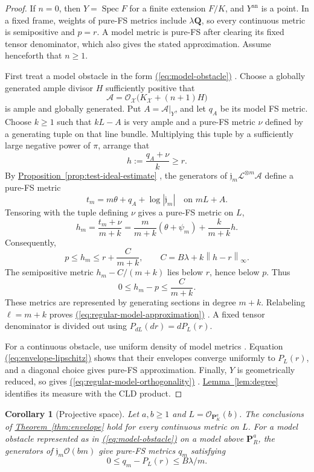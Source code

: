 \documentclass[11pt]{amsart}
\newtheorem{corollary}[theorem]{Corollary}
\theoremstyle{definition}
\theoremstyle{remark}
\numberwithin{equation}{section}
\newcommand{\an}{\mathrm{an}}
\newcommand{\PP}{\mathbf P}
\newcommand{\OO}{\mathcal O}
\newcommand{\cX}{\mathscr X}
\newcommand{\cL}{\mathscr L}
\newcommand{\cA}{\mathscr A}
\newcommand{\norm}[1]{\left\lVert#1\right\rVert}
\newcommand{\namedref}[2]{%
 \begingroup
 \ifstrequal{#1}{Section}{\hypersetup{linkcolor=sectionteal}}{%
  \ifstrequal{#1}{Appendix}{\hypersetup{linkcolor=sectionteal}}{}}%
 \hyperref[#2]{#1~\ref*{#2}}%
 \endgroup}
\renewcommand{\eqref}[1]{%
 \begingroup\hypersetup{linkcolor=equationviolet}%
 \hyperref[#1]{\textup{(\ref*{#1})}}%
 \endgroup}
\begin{document}
\begin{proof}
If \(n=0\), then \(Y=\operatorname{Spec}F\) for a finite extension
\(F/K\), and \(Y^\an\) is a point. In a fixed frame, weights of pure-FS
metrics include \(\lambda\mathbf Q\), so every continuous metric is
semipositive and \(p=r\). A model metric is pure-FS after clearing its
fixed tensor denominator, which also gives the stated approximation.
Assume henceforth that \(n\ge1\).

First treat a model obstacle in the form \eqref{eq:model-obstacle}.
Choose a globally generated ample divisor \(H\) sufficiently positive that
\[
 \cA=\OO_{\cX}\bigl(K_{\cX}+(n+1)H\bigr)
\]
is ample and globally generated. Put \(A=\cA|_Y\), and let \(q_A\)
be its model FS metric.
Choose \(k\ge1\) such that \(kL-A\) is very ample and a pure-FS metric
\(\nu\) defined by a generating tuple on that line bundle.
Multiplying this tuple by a sufficiently large negative power of \(\pi\),
arrange that
\[
 h:=\frac{q_A+\nu}{k}\ge r.
\]
By \namedref{Proposition}{prop:test-ideal-estimate}, the generators of
\(\mathfrak j_m\cL^{\otimes m}\cA\) define a pure-FS metric
\[
 t_m=m\theta+q_A+\log|\mathfrak j_m|
 \quad\text{on }mL+A.
\]
Tensoring with the tuple defining \(\nu\) gives a pure-FS metric on \(L\),
\[
 h_m=\frac{t_m+\nu}{m+k}
     =\frac m{m+k}(\theta+\psi_m)+\frac k{m+k}h.
\]
Consequently,
\[
 p\le h_m\le r+\frac C{m+k},
 \qquad C=B\lambda+k\norm{h-r}_\infty.
\]
The semipositive metric \(h_m-C/(m+k)\) lies below \(r\), hence below
\(p\). Thus
\[
 0\le h_m-p\le\frac C{m+k}.
\]
These metrics are represented by generating sections in degree \(m+k\).
Relabeling \(\ell=m+k\) proves \eqref{eq:regular-model-approximation}.
A fixed tensor denominator is divided out using
\(P_{dL}(dr)=dP_L(r)\).

For a continuous obstacle, use uniform density of model metrics
\cite[Proposition~5.16(vi) and Theorem~5.18]{BE}.
Equation~\eqref{eq:envelope-lipschitz} shows that their envelopes converge
uniformly to \(P_L(r)\), and a diagonal choice gives pure-FS approximation.
Finally, \(Y\) is geometrically reduced, so
\cite[Theorem~6.7]{BGM} gives \eqref{eq:regular-model-orthogonality}.
\namedref{Lemma}{lem:degree} identifies its measure with the CLD product.
\end{proof}

\begin{corollary}[Projective space]\label{cor:projective-envelope}
Let \(a,b\ge1\) and \(L=\OO_{\PP^a_K}(b)\).
The conclusions of \namedref{Theorem}{thm:envelope} hold for every continuous metric
on \(L\). For a model obstacle represented as in
\eqref{eq:model-obstacle} on a model above \(\PP^a_R\), the generators
of \(\mathfrak j_m\OO(bm)\) give pure-FS metrics \(q_m\) satisfying
\[
 0\le q_m-P_L(r)\le B\lambda/m.
\]
\end{corollary}
\end{document}
